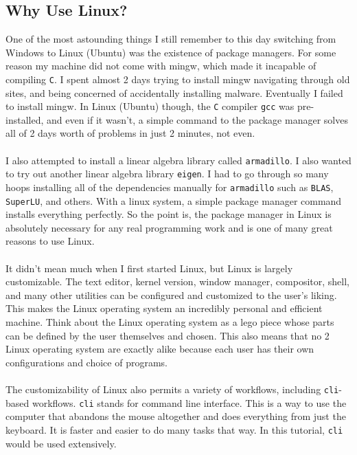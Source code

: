 \documentclass[a4paper, 12pt]{report}
\begin{document}
\begin{center}
\subsection{Why Use Linux?}

One of the most astounding things I still remember to this day switching from Windows to Linux (Ubuntu) was the existence of package managers. For some reason my machine did not come with mingw, which made it incapable of compiling \texttt{C}. I spent almost 2 days trying to install mingw navigating through old sites, and being concerned of accidentally installing malware. Eventually I failed to install mingw. In Linux (Ubuntu) though, the \texttt{C} compiler \texttt{gcc} was pre-installed, and even if it wasn't, a simple command to the package manager solves all of 2 days worth of problems in just 2 minutes, not even.
\\~\\I also attempted to install a linear algebra library called \texttt{armadillo}. I also wanted to try out another linear algebra library \texttt{eigen}. I had to go through so many hoops installing all of the dependencies manually for \texttt{armadillo} such as \texttt{BLAS}, \texttt{SuperLU}, and others. With a linux system, a simple package manager command installs everything perfectly. So the point is, the package manager in Linux is absolutely necessary for any real programming work and is one of many great reasons to use Linux.
\\~\\It didn't mean much when I first started Linux, but Linux is largely customizable. The text editor, kernel version, window manager, compositor, shell, and many other utilities can be configured and customized to the user's liking. This makes the Linux operating system an incredibly personal and efficient machine. Think about the Linux operating system as a lego piece whose parts can be defined by the user themselves and chosen. This also means that no 2 Linux operating system are exactly alike because each user has their own configurations and choice of programs. 
\\~\\The customizability of Linux also permits a variety of workflows, including \texttt{cli}-based workflows. \texttt{cli} stands for command line interface. This is a way to use the computer that abandons the mouse altogether and does everything from just the keyboard. It is faster and easier to do many tasks that way. In this tutorial, \texttt{cli} would be used extensively.

\end{center}
\end{document}
